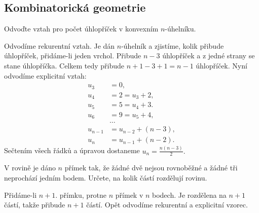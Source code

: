\subsection*{Kombinatorická geometrie}
\begin{priklad}
Odvoďte vztah pro počet úhlopříček v konvexním $n$-úhelníku.
\end{priklad}

\begin{reseni}
Odvodíme rekurentní vztah. Je dán $n$-úhelník a zjistíme, kolik přibude
úhlopříček, přidáme-li jeden vrchol. Přibude $n-3$ úhlopříček a z jedné strany
se stane úhlopříčka. Celkem tedy přibude $n+1-3+1=n-1$ úhlopříček. Nyní odvodíme
explicitní vztah:
\begin{align*}
    u_3 &= 0,\\
    u_4 &= 2=u_3+2,\\
    u_5 &= 5=u_4+3. \\
    u_6&=9=u_5+4,\\
    &\dots \\
    u_{n-1}&=u_{n-2}+(n-3),\\
    u_n &= u_{n-1}+(n-2).
\end{align*}
Sečtením všech řádků a úpravou dostaneme $u_n=\frac{n(n-3)}{2}.$
\end{reseni}

\begin{priklad}
V rovině je dáno $n$ přímek tak, že žádné dvě nejsou rovnoběžné a žádné tři neprochází
jedním bodem. Určete, na kolik částí rozdělují
rovinu.
\end{priklad}

\begin{reseni}
Přidáme-li $n+1.$ přímku, protne $n$ přímek v $n$ bodech. Je rozdělena na
$n+1$ částí, takže přibude $n+1$ částí. Opět odvodíme
rekurentní a explicitní vzorec.
\end{reseni}
